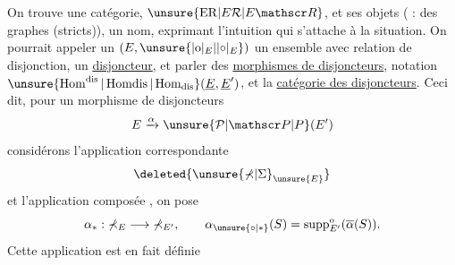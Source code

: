 On trouve une catégorie,  $\unsure{\mathrm{ER}|E\mathcal R|E\mathscr R}$, et ses objets ( : des graphes (stricts)),  un nom, exprimant l'intuition qui s'attache à la situation.
On pourrait appeler un $(E,\unsure{|\mathrm{o}|_E|\lvert\circ\rvert_E})$ un ensemble avec relation de disjonction, un \uline{disjoncteur}, et  parler des \uline{morphismes de disjoncteurs}, notation $\unsure{\operatorname{Hom}^{\mathrm{dis}}|\operatorname{Homdis}|\operatorname{Hom}_{\mathrm{dis}}}(\underline E,\underline E')$, et la \uline{catégorie des disjoncteurs}.
Ceci dit,  pour un  morphisme de disjoncteurs
\[
E\xrightarrow{\alpha}\unsure{\mathcal P|\mathscr P|P}(E')
\]
considérons l'application correspondante
\[
\deleted{\unsure{\mathbb\Sigma|\Sigma}_{\unsure{E}}}
\]
et l'application composée
,
 on pose
\[
\alpha_*:\mathbb\Sigma_E\longrightarrow\mathbb\Sigma_{E'},\qquad
\alpha_{\unsure{\circ|*}}(S)=\operatorname{supp}^{\mathrm{o}}_{E'}(\overline\alpha(S)).
\]
Cette application est en fait définie 


